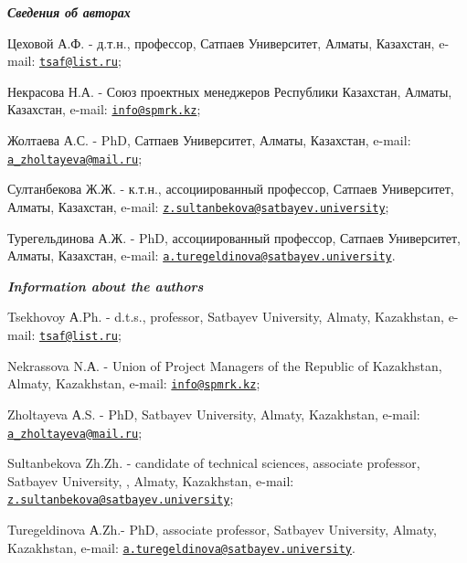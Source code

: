 \begin{authorinfo}
\hspace{1em}\emph{{\bfseries Сведения об авторах}}

Цеховой А.Ф. - д.т.н., профессор, Сатпаев Университет, Алматы,
Казахстан, e-mail: \href{mailto:tsaf@list.ru}{\nolinkurl{tsaf@list.ru}};

Некрасова Н.А. -  Союз проектных менеджеров Республики
Казахстан, Алматы, Казахстан, e-mail:
\href{mailto:info@spmrk.kz}{\nolinkurl{info@spmrk.kz}};

Жолтаева А.С. - PhD, Сатпаев Университет, Алматы, Казахстан,
e-mail:
\href{mailto:a_zholtayeva@mail.ru}{\nolinkurl{a\_zholtayeva@mail.ru}};

Султанбекова Ж.Ж. - к.т.н., ассоциированный профессор, Сатпаев
Университет, Алматы, Казахстан, \linebreak e-mail:
\href{mailto:z.sultanbekova@satbayev.university}{\nolinkurl{z.sultanbekova@satbayev.university}};

Турегельдинова А.Ж. - PhD, ассоциированный профессор, Сатпаев
Университет, Алматы, Казахстан, \linebreak e-mail:
\href{mailto:a.turegeldinova@satbayev.university}{\nolinkurl{a.turegeldinova@satbayev.university}}.

\hspace{1em}\emph{{\bfseries Information about the authors}}

Tsekhovoy А.Ph.  - d.t.s., professor, Satbayev University,
Almaty, Kazakhstan, e-mail:
\href{mailto:tsaf@list.ru}{\nolinkurl{tsaf@list.ru}};

Nekrassova N.А.  - Union of Project Managers of the Republic of
Kazakhstan, Almaty, Kazakhstan, e-mail:
\href{mailto:info@spmrk.kz}{\nolinkurl{info@spmrk.kz}};

Zholtayeva А.S. - PhD, Satbayev University, Almaty, Kazakhstan, e-mail:
\href{mailto:a_zholtayeva@mail.ru}{\nolinkurl{a\_zholtayeva@mail.ru}};

Sultanbekova Zh.Zh. - candidate of technical sciences, associate professor, Satbayev
University, , Almaty, Kazakhstan, e-mail:
\href{mailto:z.sultanbekova@satbayev.university}{\nolinkurl{z.sultanbekova@satbayev.university}};

Turegeldinova А.Zh.- PhD, associate professor, Satbayev University, Almaty,
Kazakhstan, e-mail: \linebreak \href{mailto:a.turegeldinova@satbayev.university}{\nolinkurl{a.turegeldinova@satbayev.university}}.
\end{authorinfo}
